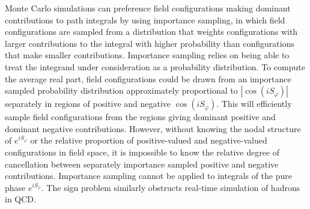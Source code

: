 Monte Carlo simulations can preference field configurations making dominant contributions to path integrals by using importance sampling,
in which field configurations are sampled from a distribution that weights configurations with larger contributions to the integral with higher probability than configurations that make smaller contributions.
Importance sampling relies on being able to treat the integrand under consideration as a probability distribution.
To compute the average real part, field configurations could be drawn from an importance sampled probability distribution approximately proportional to $|\cos(iS_\varphi)|$ separately in regions of positive and  negative $\cos(iS_\varphi)$.
This will efficiently sample field configurations from the regions giving dominant positive and dominant negative contributions.
However, without knowing the nodal structure of $e^{iS_\varphi}$ or the relative proportion of positive-valued and negative-valued configurations in field space, it is impossible to know the relative degree of cancellation between separately importance sampled positive and negative contributions.
Importance sampling cannot be applied to integrals of the pure phase $e^{iS_\varphi}$.
The sign problem similarly obstructs real-time simulation of hadrons in QCD.

